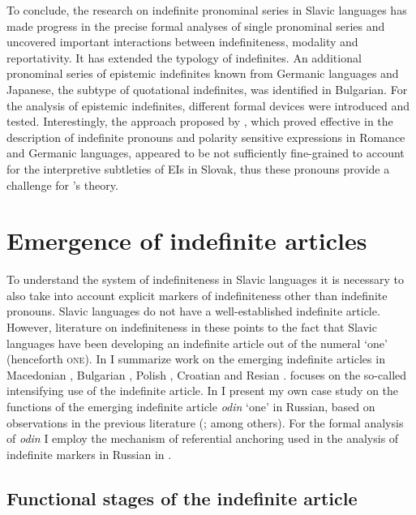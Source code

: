 \documentclass[output=paper,colorlinks,citecolor=brown]{langscibook}
\begin{document}
To conclude, the research on indefinite pronominal series in Slavic languages has made progress in the precise formal analyses of single pronominal series and uncovered important interactions between indefiniteness, modality and reportativity. It has extended the typology of indefinites. An additional pronominal series of epistemic indefinites known from Germanic languages and Japanese, the subtype of quotational indefinites, was identified in Bulgarian. For the analysis of epistemic indefinites, different formal devices were introduced and tested. Interestingly, the approach proposed by \citet{Chierchia2013}, which proved effective in the description of indefinite pronouns and polarity sensitive expressions in Romance and Germanic languages, appeared to be not sufficiently fine-grained to account for the interpretive subtleties of EIs in Slovak, thus these pronouns provide a challenge for \citeauthor{Chierchia2013}’s theory.

\section{Emergence of indefinite articles}\label{geist:sec:5}

To understand the system of indefiniteness in Slavic languages it is necessary to also take into account explicit markers of indefiniteness other than indefinite pronouns. Slavic languages do not have a well-established indefinite article. However, literature on indefiniteness in these points to the fact that Slavic languages have been developing an indefinite article out of the numeral `one' (henceforth \textsc{one}). In  I summarize work on the emerging indefinite articles in Macedonian \citep{Weiss2004}, Bulgarian \citep{Geist2013,Gorishneva2011,Gorishneva2013}, Polish \citep{Hwaszcz.Kedzierska2018}, Croatian \citep{Belaj.Matovac2015} and Resian \citep{Runic2019}.  focuses on the so-called intensifying use of the indefinite article. In  I present my own case study on the functions of the emerging indefinite article \textit{odin} `one' in Russian, based on observations in the previous literature (\citealt{Ionin2013,Paduceva2010}; among others). For the formal analysis of \textit{odin} I employ the mechanism of referential anchoring used in the analysis of indefinite markers in Russian in .

\subsection{Functional stages of the indefinite article}\label{geist:sec:5.1}
\end{document}
